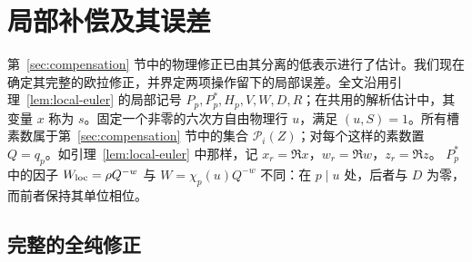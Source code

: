 \documentclass[11pt,a4paper]{article}
\numberwithin{equation}{section}
\numberwithin{figure}{section}
\theoremstyle{definition}
\theoremstyle{remark}
\begin{document}
\section{局部补偿及其误差}
\label{sec:local-compensation}

第~\ref{sec:compensation} 节中的物理修正已由其分离的低表示进行了估计。我们现在确定其完整的欧拉修正，并界定两项操作留下的局部误差。全文沿用引理~\ref{lem:local-euler} 的局部记号 $P_p,P_p^*,H_p,V,W,D,R$；在共用的解析估计中，其变量
$x$ 称为 $s$。固定一个非零的六次方自由物理行 $u$，满足
$(u,S)=1$。所有槽素数属于第~\ref{sec:compensation} 节中的集合 $\mathcal P_i(Z)$；对每个这样的素数置 $Q=q_p$。如引理~\ref{lem:local-euler} 中那样，记 $x_r=\Re x$，$w_r=\Re w$，$z_r=\Re z$。
$P_p^*$ 中的因子 $W_{\rm loc}=\rho Q^{-w}$ 与
$W=\chi_p(u)Q^{-w}$ 不同：在 $p\mid u$ 处，后者与 $D$ 为零，而前者保持其单位相位。

\subsection{完整的全纯修正}
\end{document}
